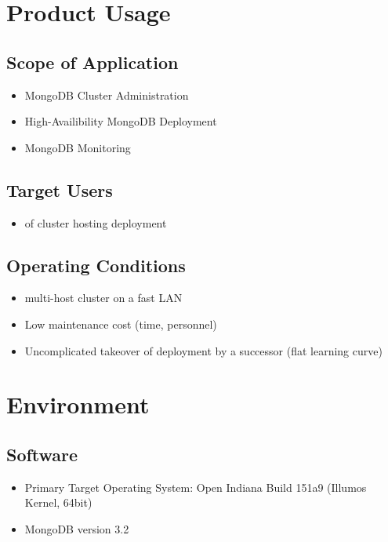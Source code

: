 \documentclass[a4paper, 11pt]{article}
\begin{document}
\section{Product Usage}

\subsection{Scope of Application}
\begin{itemize}
\item MongoDB Cluster Administration
\item High-Availibility \gls{MongoDB} Deployment
\item \gls{MongoDB} Monitoring
\end{itemize}

\subsection{Target Users}
\begin{itemize}
\item {} of \gls{cluster} hosting \mamid deployment
\end{itemize}

\subsection{Operating Conditions}
\begin{itemize}
\item multi-\gls{host} \gls{cluster} on a fast \acrshort{LAN}
\item Low maintenance cost (time, personnel)
\item Uncomplicated takeover of deployment by a successor (flat learning curve)
\end{itemize}

\section{Environment}
\subsection{Software}\label{subsec:Software}
\begin{itemize}
\item Primary Target Operating System: Open Indiana Build 151a9 (Illumos Kernel, 64bit)
\item MongoDB version 3.2
\end{itemize}
\end{document}
